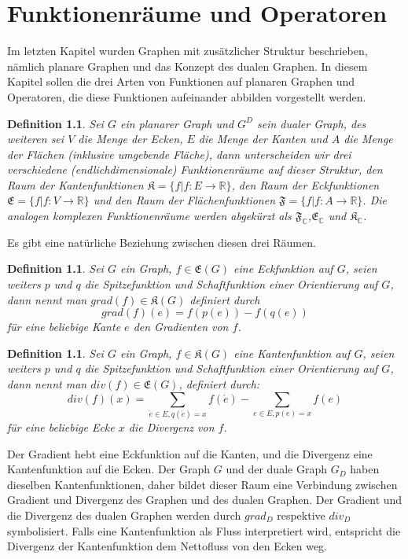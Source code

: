 \documentclass[11pt,a4paper,leqno]{report}
\newtheorem{definition}[theorem]{Definition}
\numberwithin{equation}{chapter}
\begin{document}
\chapter{Funktionenr\"aume und Operatoren}
Im letzten Kapitel wurden Graphen mit zus\"atzlicher Struktur beschrieben, nämlich planare Graphen und das Konzept des dualen Graphen. In diesem Kapitel sollen die drei Arten von Funktionen auf planaren Graphen und Operatoren, die diese Funktionen aufeinander abbilden vorgestellt werden.
\begin{definition}
	Sei $G$ ein planarer Graph und $G^D$ sein dualer Graph, des weiteren sei $V$ die Menge der Ecken, $E$ die Menge der Kanten und $A$ die Menge der Fl\"achen (inklusive umgebende Fl\"ache), dann unterscheiden wir drei verschiedene (endlichdimensionale) Funktionenr\"aume auf dieser Struktur, den Raum der Kantenfunktionen $\mathfrak{K}=\{f|f: E\rightarrow\mathbb{R}\}$, den Raum der Eckfunktionen $\mathfrak{E}=\{f|f: V\rightarrow\mathbb{R}\}$ und den Raum der Fl\"achenfunktionen $\mathfrak{F}=\{f|f: A\rightarrow\mathbb{R}\}$. Die analogen komplexen Funktionenr\"aume werden abgek\"urzt als $\mathfrak{F}_\mathbb{C}$,$\mathfrak{E}_\mathbb{C}$ und $\mathfrak{K}_\mathbb{C}$.
\end{definition}
\noindent
Es gibt eine nat\"urliche Beziehung zwischen diesen drei R\"aumen. 
\begin{definition}
	Sei $G$ ein Graph, $f\in\mathfrak{E}(G)$ eine Eckfunktion auf $G$, seien weiters $p$ und $q$ die Spitzefunktion und Schaftfunktion einer Orientierung auf $G$, dann nennt man $grad(f)\in\mathfrak{K}(G)$ definiert durch 
	$$grad(f)(e) = f(p(e)) - f(q(e))$$ 
	f\"ur eine beliebige Kante $e$ den Gradienten von $f$.
\end{definition}
\begin{definition}
	Sei $G$ ein Graph, $f\in\mathfrak{K}(G)$ eine Kantenfunktion auf $G$, seien weiters $p$ und $q$ die Spitzefunktion und Schaftfunktion einer Orientierung auf $G$, dann nennt man $div(f)\in\mathfrak{E}(G)$, definiert durch: 
	$$div(f)(x) = \sum_{\acute{e}\in E, q(\acute{e})=x}f(\acute{e}) -\sum_{e\in E, p(e)=x}f(e)$$
	f\"ur eine beliebige Ecke $x$ die Divergenz von $f$.
\end{definition}
\noindent
	Der Gradient hebt eine Eckfunktion auf die Kanten, und die Divergenz eine Kantenfunktion auf die Ecken. Der Graph $G$ und der duale Graph $G_D$ haben dieselben  Kantenfunktionen, daher bildet dieser Raum eine Verbindung zwischen Gradient und Divergenz des Graphen und des dualen Graphen. Der Gradient und die Divergenz des dualen Graphen werden durch $grad_D$ respektive $div_D$ symbolisiert. Falls eine Kantenfunktion als Fluss interpretiert wird, entspricht die Divergenz der Kantenfunktion dem Nettofluss von den Ecken weg.
\end{document}
